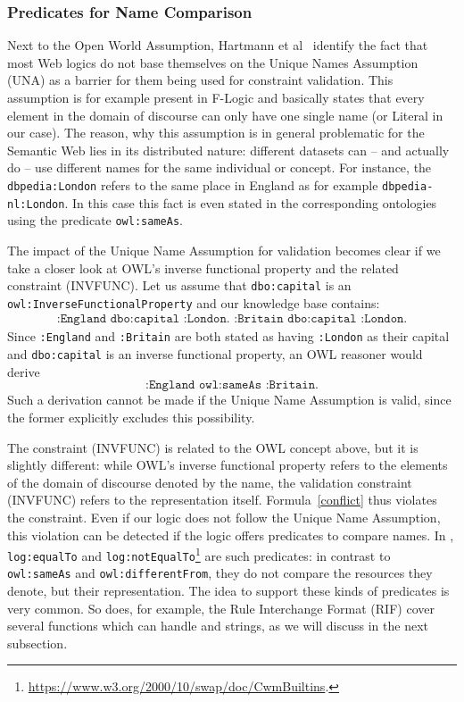 \subsubsection{Predicates for Name Comparison}
Next to the Open World Assumption, 
Hartmann et al~\cite{bosch2015}
identify the fact that most Web logics do not base themselves on the Unique Names Assumption (UNA) 
as a barrier for them being used 
for constraint validation. This assumption is for example present in F-Logic \cite{flogic}  and basically states that every element in the domain of discourse
can only have one single name (\uri or Literal in our case).  The reason, why this assumption is in general problematic for the Semantic Web lies in its distributed nature: 
different datasets can -- and actually do -- use different names for the same individual or concept.
For instance, the \uri \texttt{dbpedia:London} refers to the same place in England as 
for example \texttt{dbpedia-nl:London}. In this case this fact is even stated in the corresponding ontologies using the predicate \texttt{owl:sameAs}.

The impact of the Unique Name Assumption for \rdf validation becomes clear if we take a closer look at OWL's inverse functional property and the related constraint (INVFUNC). 
Let us assume that \texttt{dbo:capital} is an \texttt{owl:InverseFunctionalProperty} and our knowledge base contains:
\begin{multline}\label{conflict}
 \texttt{:England dbo:capital :London. :Britain dbo:capital :London.}
\end{multline}
Since \texttt{:England} and \texttt{:Britain} are both stated as having \texttt{:London} as their capital and \texttt{dbo:capital} is an inverse functional property,
an OWL reasoner would derive  
\begin{equation}
 \texttt{:England  owl:sameAs :Britain.}
\end{equation}
Such a derivation cannot be made if the Unique Name Assumption is valid, since the former explicitly excludes this possibility. 

The constraint (INVFUNC) is related to the OWL concept above, but it is slightly different: while OWL's inverse functional property refers to the elements of the domain of
discourse denoted by the name, the validation constraint (INVFUNC) refers to the representation itself. Formula~\ref{conflict} thus violates the constraint. 
Even if our logic does not 
follow the Unique Name Assumption, this violation can be detected if the logic offers predicates to compare names.
In \nthreelogic,
\texttt{log:equalTo} and \texttt{log:notEqualTo}\footnote{\url{https://www.w3.org/2000/10/swap/doc/CwmBuiltins}.} are such predicates: in contrast to
\texttt{owl:sameAs} and \texttt{owl:differentFrom}, they do not compare the resources they denote, but their representation. 
The idea to support these kinds of
predicates is very common. So does, for example,
the Rule Interchange Format (RIF) cover several functions which can handle \uris and strings, 
as we will discuss in the next subsection.
 






